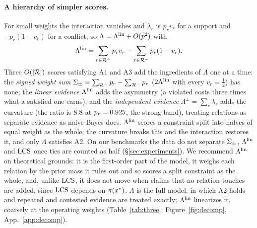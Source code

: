 \paragraph{A hierarchy of simpler scores.} For small weights the interaction vanishes and
$\lambda_r$ is $p_rv_r$ for a support and $-p_r(1-v_r)$ for a conflict, so $\Lambda=\Lambda^{\mathrm{lin}}+O(p^2)$ with
\begin{equation}
\Lambda^{\mathrm{lin}}=\sum_{r\in\mathcal{R}^{+}}p_rv_r-\sum_{r\in\mathcal{R}^{-}}p_r(1-v_r).
\label{eq:llin}
\end{equation}
Three $O(|\mathcal{R}|)$ scores satisfying A1 and A3 add the ingredients of $\Lambda$ one at a time: the
\emph{signed weight sum} $\Sigma_{\pm}=\sum_{\mathcal{R}^{+}}p_r-\sum_{\mathcal{R}^{-}}p_r$ ($2\Lambda^{\mathrm{lin}}$ with every $v_r=\frac12$) has
none; the \emph{linear evidence} $\Lambda^{\mathrm{lin}}$ adds the asymmetry (a violated \ent{} costs three times what a
satisfied one earns); and the \emph{independent evidence} $\Lambda^{\perp}=\sum_r\lambda_r$ adds the
curvature (the ratio is $8.8$ at $p_r=0.925$, the strong band), treating relations as separate
evidence as naive Bayes does. $\Lambda^{\mathrm{lin}}$ scores a constraint split into halves of equal weight as the
whole; the curvature breaks this and the interaction restores it, and only $\Lambda$ satisfies A2. On our benchmarks the data do not separate $\Sigma_{\pm}$, $\Lambda^{\mathrm{lin}}$ and $\mathrm{LCS}$ once ties are counted as half
(\S\ref{sec:experiments}). We recommend $\Lambda^{\mathrm{lin}}$ on theoretical grounds: it is the first-order part of
the model, it weighs each relation by the prior mass it rules out and so scores a split constraint as
the whole, and, unlike $\mathrm{LCS}$, it does not move when claims that no relation touches are added, since
$\mathrm{LCS}$ depends on $\pi(x^{\ast})$. $\Lambda$ is the full model, in which A2 holds and repeated and contested
evidence are treated exactly; $\Lambda^{\mathrm{lin}}$ linearizes it, coarsely at the operating weights (Table~\ref{tab:three};
Figure~\ref{fig:decomp}, App.~\ref{app:decomp}).

